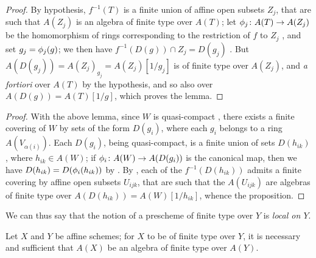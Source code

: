 \begin{proof}
\label{proof-1.6.3.2.1}
By hypothesis, $f^{-1}(T)$ is a finite union of affine open subsets $Z_j$, that are such that $A(Z_j)$ is an algebra of finite type over $A(T)$;
let $\phi_j\colon A(T)\to A(Z_j)$ be the homomorphism of rings corresponding to the restriction of $f$ to $Z_j$ , and set $g_j=\phi_j(g)$;
we then have $f^{-1}(D(g))\cap Z_j=D(g_j)$ .
But $A(D(g_j))=A(Z_j)_{g_j}=A(Z_j)[1/g_j]$ is of finite type over $A(Z_j)$, and \emph{a fortiori} over $A(T)$ by the hypothesis, and so also over $A(D(g))=A(T)[1/g]$, which proves the lemma.
\end{proof}

\begin{proof}
\label{proof-1.6.3.2}
With the above lemma, since $W$ is quasi-compact , there exists a finite covering of $W$ by sets of the form $D(g_i)$, where each $g_i$ belongs to a ring $A(V_{\alpha(i)})$.
Each $D(g_i)$, being quasi-compact, is a finite union of sets $D(h_{ik})$, where $h_{ik}\in A(W)$;
if $\phi_i\colon A(W)\to A(D(g_i))$ is the canonical map, then we have $D(h_{ik})=D(\phi_i(h_{ik}))$ by .
By , each of the $f^{-1}(D(h_{ik}))$ admits a finite covering by affine open subsets $U_{ijk}$, that are such that the $A(U_{ijk})$ are algebras of finite type over $A(D(h_{ik}))=A(W)[1/h_{ik}]$, whence the proposition.
\end{proof}

We can thus say that the notion of a prescheme of finite type over $Y$ is \emph{local on $Y$}.

\begin{prop}[6.3.3]
\label{1.6.3.3}
Let $X$ and $Y$ be affine schemes;
for $X$ to be of finite type over $Y$, it is necessary and sufficient that $A(X)$ be an algebra of finite type over $A(Y)$.
\end{prop}


